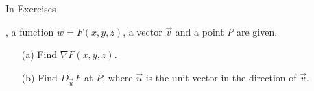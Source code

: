 {\noindent In Exercises}
{, a function $w=F(x,y,z)$, a vector $\vec v$ and a point $P$ are given. 
\begin{enumerate}
	\item [(a)] Find $\nabla F(x,y,z)$.
	\item [(b)] Find $D_{\vec u\,}F$ at $P$, where $\vec u$ is the unit vector in the direction of $\vec v$.
\end{enumerate}
}
